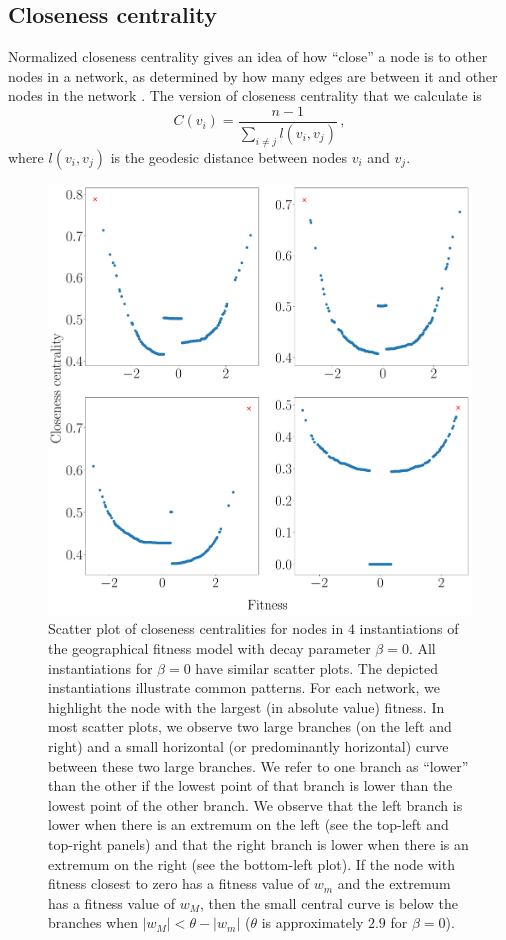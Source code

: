 \documentclass[%
 reprint,
 amsmath,amssymb,
 aps,
]{revtex4-1}
\begin{document}

\subsection{Closeness centrality}\label{close}

Normalized closeness centrality gives an idea of how ``close'' a node is to other nodes in a network, as determined by how many edges are between it and other nodes in the network \cite{newman2018}. The version of closeness centrality that we calculate is
\begin{equation}
    C(v_i) = \frac{n - 1}{\sum\limits_{i \neq j} l(v_i,v_j)}\,,
\end{equation}
where $l(v_i, v_j)$ is the geodesic distance between nodes $v_i$ and $v_j$.



\begin{figure}
    \centering
    \includegraphics[width=0.8\linewidth]{geographic_beta_0_examples2_largerfont.pdf}
    \caption{Scatter plot of closeness centralities for nodes in $4$ instantiations of the geographical fitness model with decay parameter $\beta = 0$. All instantiations for $\beta = 0$ have similar scatter plots. The depicted instantiations illustrate common patterns. For each network, we highlight the node with the largest (in absolute value) fitness. In most scatter plots, we observe two large branches (on the left and right) and a small horizontal (or predominantly horizontal) curve between these two large branches. We refer to one branch as ``lower'' than the other if the lowest point of that branch is lower than the lowest point of the other branch. We observe that the left branch is lower when there is an extremum on the left (see the top-left and top-right panels) and that the right branch is lower when there is an extremum on the right (see the bottom-left plot). 
        {\color{red}If the node with fitness closest to zero has a fitness value of $w_m$ and the extremum has a fitness value of $w_M$, then the small central curve is below the branches when $|w_M| < \theta - |w_m|$ ($\theta$ is approximately $2.9$ for $\beta = 0$).}
    }
    \label{fig:closeness_example}
\end{figure}
\end{document}
